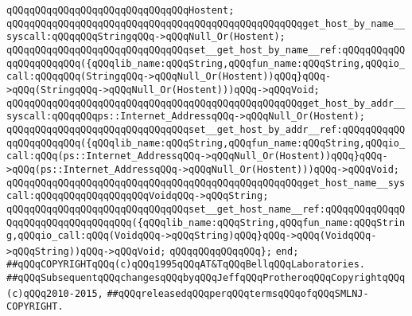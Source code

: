 \newline
\verb|qQQqqQQqqQQqqQQqqQQqqQQqqQQqqQQqHostent;|\newline
\newline
\verb|qQQqqQQqqQQqqQQqqQQqqQQqqQQqqQQqqQQqqQQqqQQqqQQqqQQqget_host_by_name__syscall:qQQqqQQqStringqQQq->qQQqNull_Or(Hostent);|\newline
\verb|qQQqqQQqqQQqqQQqqQQqqQQqqQQqqQQqset__get_host_by_name__ref:qQQqqQQqqQQqqQQqqQQqqQQq({qQQqlib_name:qQQqString,qQQqfun_name:qQQqString,qQQqio_call:qQQqqQQq(StringqQQq->qQQqNull_Or(Hostent))qQQq}qQQq->qQQq(StringqQQq->qQQqNull_Or(Hostent)))qQQq->qQQqVoid;|\newline
\newline
\verb|qQQqqQQqqQQqqQQqqQQqqQQqqQQqqQQqqQQqqQQqqQQqqQQqqQQqget_host_by_addr__syscall:qQQqqQQqps::Internet_AddressqQQq->qQQqNull_Or(Hostent);|\newline
\verb|qQQqqQQqqQQqqQQqqQQqqQQqqQQqqQQqset__get_host_by_addr__ref:qQQqqQQqqQQqqQQqqQQqqQQq({qQQqlib_name:qQQqString,qQQqfun_name:qQQqString,qQQqio_call:qQQq(ps::Internet_AddressqQQq->qQQqNull_Or(Hostent))qQQq}qQQq->qQQq(ps::Internet_AddressqQQq->qQQqNull_Or(Hostent)))qQQq->qQQqVoid;|\newline
\newline
\verb|qQQqqQQqqQQqqQQqqQQqqQQqqQQqqQQqqQQqqQQqqQQqqQQqqQQqget_host_name__syscall:qQQqqQQqqQQqqQQqqQQqVoidqQQq->qQQqString;|\newline
\verb|qQQqqQQqqQQqqQQqqQQqqQQqqQQqqQQqset__get_host_name__ref:qQQqqQQqqQQqqQQqqQQqqQQqqQQqqQQqqQQq({qQQqlib_name:qQQqString,qQQqfun_name:qQQqString,qQQqio_call:qQQq(VoidqQQq->qQQqString)qQQq}qQQq->qQQq(VoidqQQq->qQQqString))qQQq->qQQqVoid;|\newline
\verb|qQQqqQQqqQQqqQQq};|\newline
\verb|end;|\newline
\newline
\verb|##qQQqCOPYRIGHTqQQq(c)qQQq1995qQQqAT&TqQQqBellqQQqLaboratories.|\newline
\verb|##qQQqSubsequentqQQqchangesqQQqbyqQQqJeffqQQqProtheroqQQqCopyrightqQQq(c)qQQq2010-2015,|\newline
\verb|##qQQqreleasedqQQqperqQQqtermsqQQqofqQQqSMLNJ-COPYRIGHT.|\newline

